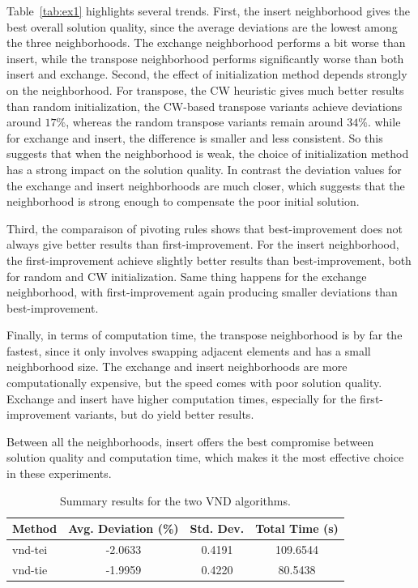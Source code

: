 Table~\ref{tab:ex1} highlights several trends. First, the insert neighborhood gives the best overall solution quality, since the average deviations are the lowest among the three neighborhoods. The exchange neighborhood performs a bit worse than insert, while the transpose neighborhood performs significantly worse than both insert and exchange.
Second, the effect of initialization method depends strongly on the neighborhood. For transpose, the CW heuristic gives much better results than random initialization, the CW-based transpose variants achieve deviations around \(17\%\), whereas the random transpose variants remain around \(34\%\). while for exchange and insert, the difference is smaller and less consistent. 
So this suggests that when the neighborhood is weak, the choice of initialization method has a strong impact on the solution quality. In contrast the deviation values for the exchange and insert neighborhoods are much closer, which suggests that the neighborhood is strong enough to compensate the poor initial solution. 

Third, the comparaison of pivoting rules shows that best-improvement does not always give better results than first-improvement. For the insert neighborhood, the first-improvement achieve slightly better results than best-improvement, both for random and CW initialization. Same thing happens for the exchange neighborhood, with first-improvement again producing smaller deviations than best-improvement.

Finally, in terms of computation time, the transpose neighborhood is by far the fastest, since it only involves swapping adjacent elements and has a small neighborhood size. The exchange and insert neighborhoods are more computationally expensive, but the speed comes with poor solution quality. Exchange and insert have higher computation times, especially for the first-improvement variants, but do yield better results.

Between all the neighborhoods, insert offers the best compromise between solution quality and computation time, which makes it the most effective choice in these experiments.

\begin{table}[H]
\centering
\caption{Summary results for the two VND algorithms.}
\label{tab:ex2}
\begin{tabular}{lccc}
\toprule
\textbf{Method} & \textbf{Avg. Deviation (\%)} & \textbf{Std. Dev.} & \textbf{Total Time (s)} \\
\midrule
vnd-tei & -2.0633 & 0.4191 & 109.6544 \\
vnd-tie & -1.9959 & 0.4220 & 80.5438 \\
\bottomrule
\end{tabular}
\end{table}

